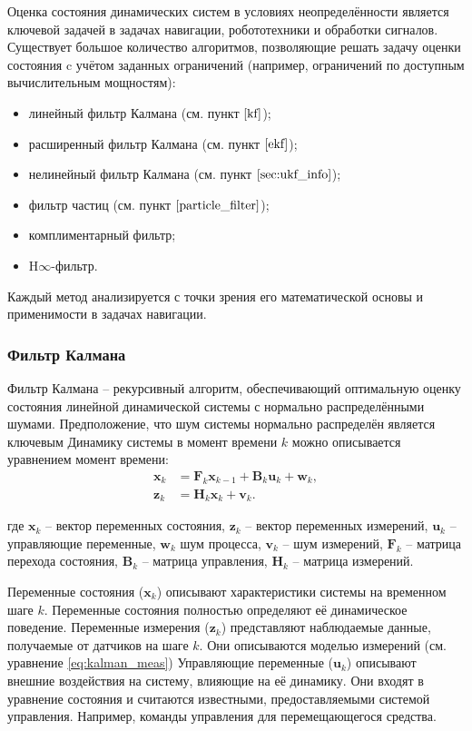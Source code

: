 Оценка состояния динамических систем в условиях неопределённости является ключевой задачей в задачах навигации,
робототехники и обработки сигналов.
Существует большое количество алгоритмов, позволяющие решать задачу оценки состояния
c учётом заданных ограничений (например, ограничений по доступным вычислительным мощностям):
\begin{itemize}
	\item линейный фильтр Калмана (см. пункт $\ref{kf}$);
	\item расширенный фильтр Калмана (см. пункт $\ref{ekf}$);
	\item нелинейный фильтр Калмана (см. пункт $\ref{sec:ukf_info}$);
	\item фильтр частиц (см. пункт $\ref{particle_filter}$);
	\item комплиментарный фильтр;
	\item H$\infty$-фильтр.
\end{itemize}
Каждый метод анализируется с точки зрения его математической основы и применимости в задачах навигации.

\subsubsection{Фильтр Калмана}
\label{kf}

Фильтр Калмана -- рекурсивный алгоритм,
обеспечивающий оптимальную оценку состояния линейной динамической системы с нормально распределёнными шумами.
Предположение, что шум системы нормально распределён является ключевым 
Динамику системы в момент времени \( k \) можно описывается уравнением момент времени:
\begin{align}
    \mathbf{x}_k &= \mathbf{F}_k \mathbf{x}_{k-1} + \mathbf{B}_k \mathbf{u}_k + \mathbf{w}_k, \label{eq:kalman_state} \\
    \mathbf{z}_k &= \mathbf{H}_k \mathbf{x}_k + \mathbf{v}_k. \label{eq:kalman_meas}
\end{align}

где \(\mathbf{x}_k\) -- вектор переменных состояния, \(\mathbf{z}_k\) -- вектор переменных измерений,
\(\mathbf{u}_k\) -- управляющие переменные, \(\mathbf{w}_k\) шум процесса,
\(\mathbf{v}_k \) -- шум измерений, \(\mathbf{F}_k\) -- матрица перехода состояния,
\(\mathbf{B}_k\) -- матрица управления, \(\mathbf{H}_k\) -- матрица измерений.

Переменные состояния (\(\mathbf{x}_k\)) описывают характеристики системы на временном шаге \( k \).
Переменные состояния полностью определяют её динамическое поведение.
Переменные измерения (\(\mathbf{z}_k\)) представляют наблюдаемые данные, получаемые от датчиков на шаге \( k \). 
Они описываются моделью измерений (см. уравнение \ref{eq:kalman_meas})
Управляющие переменные (\(\mathbf{u}_k\)) описывают внешние воздействия на систему, влияющие на её динамику.
Они входят в уравнение состояния и считаются известными, предоставляемыми системой управления.
Например, команды управления для перемещающегося средства.

